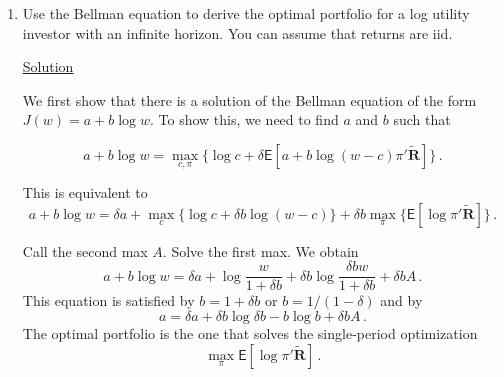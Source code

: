 \documentclass[letterpaper,english]{article}
\newcommand{\mye}{\ensuremath{\mathsf{E}}}
\begin{document}
\begin{enumerate}
\item Use the Bellman equation to derive the optimal portfolio for a log utility investor with an infinite horizon.  You can assume that returns are iid.

\underline{Solution}

We first show that there is a solution of the Bellman equation of the form $J(w) = a + b \log w$.  To show this, we need to find $a$ and $b$ such that

$$a + b \log w = \max_{c, \pi} \bigg\{\log c + \delta \mye [ a + b \log (w-c)\pi'\widetilde{\mathbf{R}}]\bigg\}\,.$$

This is equivalent to
$$a + b \log w = \delta a + \max_c \bigg\{ \log c + \delta b \log (w-c) \bigg\} + \delta b \max_\pi \bigg\{\mye [\log \pi'\widetilde{\mathbf{R}}]\bigg\}\,.$$

Call the second max $A$.  Solve the first max.  We obtain
$$a + b \log w = \delta a + \log \frac{w}{1+\delta b}  + \delta b \log \frac{\delta bw}{1+\delta b} + \delta b A\,.$$
This equation is satisfied by
$b = 1 + \delta b$ or $b = 1/(1-\delta)$ and by
$$a = \delta a + \delta b \log \delta b - b \log b + \delta b A\,.$$
The optimal portfolio is the one that solves the single-period optimization
$$ \max_\pi \mye [\log \pi'\widetilde{\mathbf{R}}]\,.$$
\end{enumerate}
\end{document}
